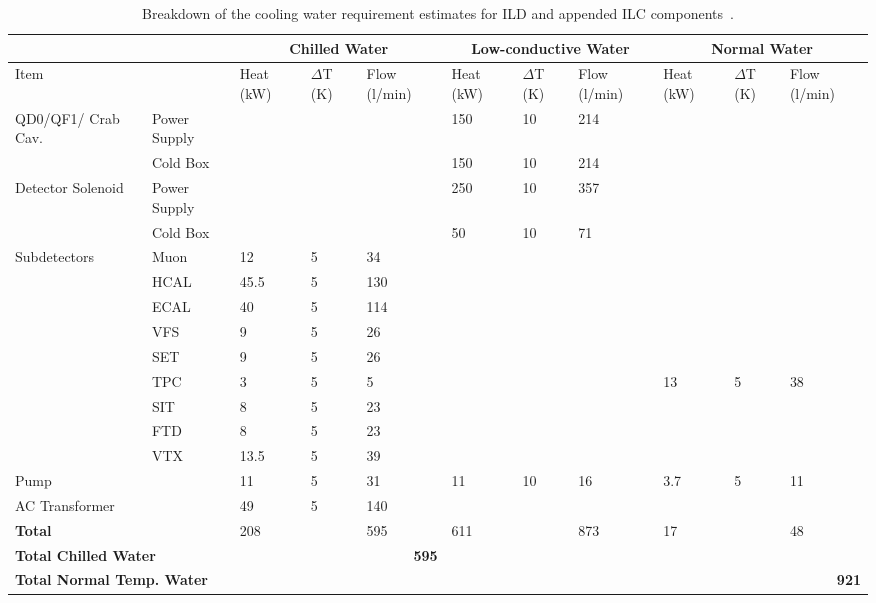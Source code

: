 \begin{table}[]
    \centering
    \begin{tabular}{m{1.4cm}|m{1.7cm}|m{0.6cm}|m{0.6cm}|m{0.7cm}|m{0.6cm}|m{0.6cm}|m{0.7cm}|m{0.6cm}|m{0.6cm}|m{0.7cm}}
    \multicolumn{2}{m{1.4cm}|}{}& \multicolumn{3}{c|}{Chilled Water} & \multicolumn{3}{c|}{Low-conductive Water} & \multicolumn{3}{c}{Normal Water} \\ \hline
    \multicolumn{2}{m{1.4cm}|}{Item} & Heat (kW) & $\Delta$T (K) & Flow (l/min) & Heat (kW) & $\Delta$T (K) & Flow (l/min) & Heat (kW) & $\Delta$T (K) &Flow (l/min) \\ \hline
    \multirow{2}{1.4cm}{QD0/QF1/ Crab Cav.} & Power Supply & & & & 150 & 10 & 214 & & & \\
    & Cold Box & & & & 150 & 10 & 214 & & & \\\hline
    \multirow{2}{1.4cm}{Detector Solenoid} & Power Supply & & & & 250 & 10 & 357 & & & \\
    & Cold Box & & & & 50 & 10 & 71 & & & \\\hline
    \multirow{9}{1.4cm}{Subdetectors} & Muon & 12 & 5 & 34 & & & & & \\
    & HCAL & 45.5 & 5 & 130 & & & & & & \\
    & ECAL & 40 & 5 & 114 & & & & & & \\
    & VFS & 9 & 5 & 26 & & & & & & \\
    & SET & 9 & 5 & 26 & & & & & & \\
    & TPC & 3 & 5 & 5 & & & & 13 & 5 & 38\\
    & SIT & 8 & 5 & 23 & & & & & & \\
    & FTD & 8 & 5 & 23 & & & & & & \\
    & VTX & 13.5 & 5 & 39 & & & & & & \\\hline
    \multicolumn{2}{m{2cm}|}{Pump} & 11 & 5 & 31 & 11 & 10 & 16 & 3.7 & 5 & 11\\ \hline
    \multicolumn{2}{m{2cm}|}{AC Transformer} & 49 & 5 & 140 & & & & & & \\ \hline
    \multicolumn{2}{m{2cm}|}{{\bf Total}} & 208 & & 595 & 611 & & 873 & 17 & & 48 \\ \hline
    \multicolumn{2}{l|}{{\bf Total Chilled Water}} & \multicolumn{3}{r|}{{\bf 595}} & \multicolumn{6}{r}{}\\ \hline
    \multicolumn{2}{l|}{{\bf Total Normal Temp. Water}} & \multicolumn{3}{r|}{} & \multicolumn{6}{r}{{\bf 921}}\\ \hline

    \end{tabular}
    \caption{Breakdown of the cooling water requirement estimates for ILD and appended ILC components~\cite{ild:bib:services}.}
    \label{tab:integration:cooling}
\end{table}

